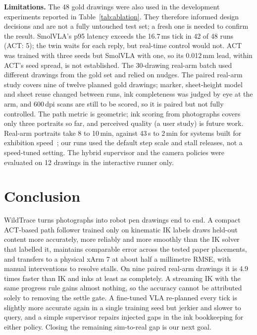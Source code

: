 \documentclass[conference]{IEEEtran}
\newcommand{\mm}{\,mm\xspace}
\begin{document}
\textbf{Limitations.} The 48 gold drawings were also used in the development experiments reported in
Table~\ref{tab:ablation}. They therefore informed design decisions and are not a fully untouched
test set; a fresh one is needed to confirm the result.
SmolVLA's p95 latency exceeds the 16.7\,ms tick in 42 of 48 runs (ACT: 5); the twin waits for each reply, but
real-time control would not. ACT was trained with three seeds but SmolVLA with one, so its 0.012\mm lead, within ACT's seed spread,
is not established. The 30-drawing real-arm batch used different drawings from the gold set and relied on nudges. The paired real-arm study covers nine of twelve planned gold drawings;
marker, sheet-height model and sheet reuse changed between runs, ink completeness was judged by eye at the
arm, and 600\,dpi scans are still to be scored, so it is paired but not fully controlled. The path metric is
geometric; ink scoring from photographs covers only three portraits so far, and perceived quality (a user study)
is future work. Real-arm portraits take 8 to 10\,min, against
43\,s to 2\,min for systems built for exhibition speed~\cite{wang2019robocodraw,gao2020aisketcher,nasrat2023artistic};
our runs used the default step scale and stall releases, not a speed-tuned setting. The hybrid supervisor and
the camera policies were evaluated on 12 drawings in the interactive runner only.

\section{Conclusion}

WildTrace turns photographs into robot pen drawings end to end. A compact ACT-based path follower trained only on
kinematic IK labels draws held-out content more accurately, more reliably and more smoothly than the IK
solver that labelled it, maintains comparable error across the tested paper placements, and transfers to a physical xArm 7 at about half
a millimetre RMSE, with manual interventions to resolve stalls. On nine paired real-arm drawings it is 4.9 times
faster than IK and inks at least as completely. A streaming IK with the same progress rule gains almost
nothing, so the accuracy cannot be attributed solely to removing the settle gate. A fine-tuned VLA re-planned
every tick is slightly more accurate again in a single training seed but jerkier and slower to query, and a
simple supervisor repairs injected gaps in the ink bookkeeping for either policy. Closing the remaining sim-to-real gap is our next goal.



\end{document}
